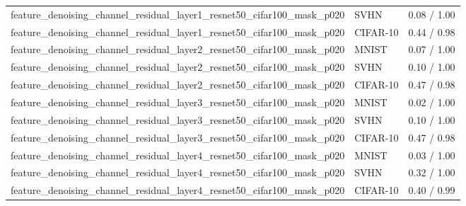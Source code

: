 \begin{tabular}{lll}
feature\_denoising\_channel\_residual\_layer1\_resnet50\_cifar100\_mask\_p020 & SVHN & 0.08 / 1.00 \\
feature\_denoising\_channel\_residual\_layer1\_resnet50\_cifar100\_mask\_p020 & CIFAR-10 & 0.44 / 0.98 \\
feature\_denoising\_channel\_residual\_layer2\_resnet50\_cifar100\_mask\_p020 & MNIST & 0.07 / 1.00 \\
feature\_denoising\_channel\_residual\_layer2\_resnet50\_cifar100\_mask\_p020 & SVHN & 0.10 / 1.00 \\
feature\_denoising\_channel\_residual\_layer2\_resnet50\_cifar100\_mask\_p020 & CIFAR-10 & 0.47 / 0.98 \\
feature\_denoising\_channel\_residual\_layer3\_resnet50\_cifar100\_mask\_p020 & MNIST & 0.02 / 1.00 \\
feature\_denoising\_channel\_residual\_layer3\_resnet50\_cifar100\_mask\_p020 & SVHN & 0.10 / 1.00 \\
feature\_denoising\_channel\_residual\_layer3\_resnet50\_cifar100\_mask\_p020 & CIFAR-10 & 0.47 / 0.98 \\
feature\_denoising\_channel\_residual\_layer4\_resnet50\_cifar100\_mask\_p020 & MNIST & 0.03 / 1.00 \\
feature\_denoising\_channel\_residual\_layer4\_resnet50\_cifar100\_mask\_p020 & SVHN & 0.32 / 1.00 \\
feature\_denoising\_channel\_residual\_layer4\_resnet50\_cifar100\_mask\_p020 & CIFAR-10 & 0.40 / 0.99 \\
\bottomrule
\end{tabular}

